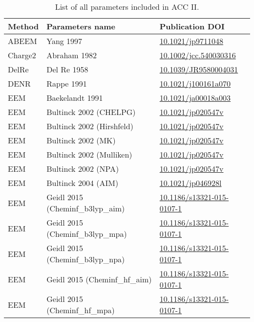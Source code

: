 \documentclass[oneside]{memoir}
\begin{document}
\begin{table}
\renewcommand{\tablename}{\textbf{Supplementary table}}
\renewcommand\thetable{\textbf{2}}
\caption{List of all parameters included in ACC II.}
\begin{tabular}{lll}
\toprule
\textbf{Method} & \textbf{Parameters name} & \textbf{Publication DOI}\\
\midrule
ABEEM & Yang 1997 & \href{https://doi.org/10.1021/jp9711048}{10.1021/jp9711048}\\
Charge2 & Abraham 1982 & \href{https://doi.org/10.1002/jcc.540030316}{10.1002/jcc.540030316}\\
DelRe & Del Re 1958 & \href{https://doi.org/10.1039/JR9580004031}{10.1039/JR9580004031}\\
DENR & Rappe 1991 & \href{https://doi.org/10.1021/j100161a070}{10.1021/j100161a070}\\
EEM & Baekelandt 1991 & \href{https://doi.org/10.1021/ja00018a003}{10.1021/ja00018a003}\\
EEM & Bultinck 2002 (CHELPG) & \href{https://doi.org/10.1021/jp020547v}{10.1021/jp020547v}\\
EEM & Bultinck 2002 (Hirshfeld) & \href{https://doi.org/10.1021/jp020547v}{10.1021/jp020547v}\\
EEM & Bultinck 2002 (MK) & \href{https://doi.org/10.1021/jp020547v}{10.1021/jp020547v}\\
EEM & Bultinck 2002 (Mulliken) & \href{https://doi.org/10.1021/jp020547v}{10.1021/jp020547v}\\
EEM & Bultinck 2002 (NPA) & \href{https://doi.org/10.1021/jp020547v}{10.1021/jp020547v}\\
EEM & Bultinck 2004 (AIM) & \href{https://doi.org/10.1021/jp046928l}{10.1021/jp046928l}\\
EEM & Geidl 2015 (Cheminf\_b3lyp\_aim) & \href{https://doi.org/10.1186/s13321-015-0107-1}{10.1186/s13321-015-0107-1}\\
EEM & Geidl 2015 (Cheminf\_b3lyp\_mpa) & \href{https://doi.org/10.1186/s13321-015-0107-1}{10.1186/s13321-015-0107-1}\\
EEM & Geidl 2015 (Cheminf\_b3lyp\_npa) & \href{https://doi.org/10.1186/s13321-015-0107-1}{10.1186/s13321-015-0107-1}\\
EEM & Geidl 2015 (Cheminf\_hf\_aim) & \href{https://doi.org/10.1186/s13321-015-0107-1}{10.1186/s13321-015-0107-1}\\
EEM & Geidl 2015 (Cheminf\_hf\_mpa) & \href{https://doi.org/10.1186/s13321-015-0107-1}{10.1186/s13321-015-0107-1}\\

\end{tabular}
\end{table}
\end{document}
